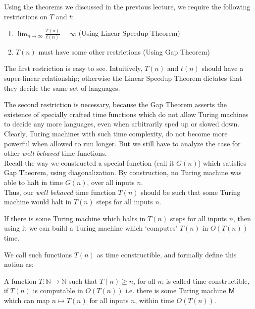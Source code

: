 \documentclass[usletter]{article}
\newcommand{\namedset}[1]
           {\ensuremath{\mathbb{#1}}}
\newcommand{\machine}[1]
           {\ensuremath{\textnormal{\textsf{#1}}}}
\newcommand{\term}[1]{\textsf{#1}}
\newcommand{\namethm}[1]{\term{#1} Theorem}
\newcommand{\usingthm}[1]{(Using \namethm{#1})}
\begin{document}
\noindent
 Using the theorems we discussed in the previous lecture, we require the following restrictions on $T$ and $t$:

\begin{enumerate}
  \item $ \lim_{n \to \infty} \frac{T(n)}{t(n)} = \infty $ \hfill \usingthm{Linear Speedup}
  \item $T(n)$ must have some other restrictions \hfill \usingthm{Gap}
\end{enumerate}

\noindent
The first restriction is easy to see. Intuitively, $T(n)$ and $t(n)$ should have a super-linear relationship; otherwise the \namethm{Linear Speedup} dictates that they decide the same set of languages.

The second restriction is necessary, because the \namethm{Gap} asserts the existence of specially crafted time functions which do not allow Turing machines to decide any more languages, even when arbitrarily sped up or slowed down. Clearly, Turing machines with such time complexity, do not become more powerful when allowed to run longer. But we still have to analyze the case for other \textit{well behaved} time functions.  \\

\noindent
Recall the way we constructed a special function (call it $G(n)$) which satisfies \namethm{Gap}, using diagonalization. By construction, no Turing machine was able to halt in time $G(n)$, over all inputs $n$.\\
Thus, our \textit{well behaved} time function $T(n)$ should be such that some Turing machine would halt in $T(n)$ steps for all inputs $n$.

\begin{remark}
If there is some Turing machine which halts in $T(n)$ steps for all inputs $n$, then using it we can build a Turing machine which `computes' $T(n)$ in $O(T(n))$ time.
\end{remark}

\noindent
We call such functions $T(n)$ as \term{time constructible}, and formally define this notion as:

\begin{definition}
A function $T: \namedset{N} \to \namedset{N}$ such that $T(n) \geq n$, for all $n$; is called time constructible, if $T(n)$ is computable in $O(T(n))$ i.e. there is some Turing machine \machine{M} which can map $n \mapsto T(n)$ for all inputs $n$, within time $O(T(n))$.
\end{definition}
\end{document}
